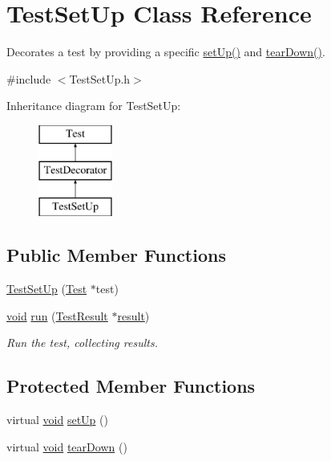 \hypertarget{class_test_set_up}{\section{Test\-Set\-Up Class Reference}
\label{class_test_set_up}
}


Decorates a test by providing a specific \hyperlink{class_test_set_up_a9b40e24a51084e66a53fce52b4c6314b}{set\-Up()} and \hyperlink{class_test_set_up_aa935d1ec432a2d3f1be86c1172b1c028}{tear\-Down()}.  




{\ttfamily \#include $<$Test\-Set\-Up.\-h$>$}

Inheritance diagram for Test\-Set\-Up\-:\begin{figure}[H]
\begin{center}
\leavevmode
\includegraphics[height=3.000000cm]{class_test_set_up}
\end{center}
\end{figure}
\subsection*{Public Member Functions}
\begin{DoxyCompactItemize}
\item 
\hyperlink{class_test_set_up_af89f6399e1c84dd43ac43253a6550c44}{Test\-Set\-Up} (\hyperlink{class_test}{Test} $\ast$test)
\item 
\hyperlink{wglew_8h_aeea6e3dfae3acf232096f57d2d57f084}{void} \hyperlink{class_test_set_up_aa3f79125254c288d6effee6df8e7d5fb}{run} (\hyperlink{class_test_result}{Test\-Result} $\ast$\hyperlink{glew_8h_a5fb5836a37f7607602a16ad733ed6357}{result})
\begin{DoxyCompactList}\small\item\em Run the test, collecting results. \end{DoxyCompactList}\end{DoxyCompactItemize}
\subsection*{Protected Member Functions}
\begin{DoxyCompactItemize}
\item 
virtual \hyperlink{wglew_8h_aeea6e3dfae3acf232096f57d2d57f084}{void} \hyperlink{class_test_set_up_a9b40e24a51084e66a53fce52b4c6314b}{set\-Up} ()
\item 
virtual \hyperlink{wglew_8h_aeea6e3dfae3acf232096f57d2d57f084}{void} \hyperlink{class_test_set_up_aa935d1ec432a2d3f1be86c1172b1c028}{tear\-Down} ()
\end{DoxyCompactItemize}
